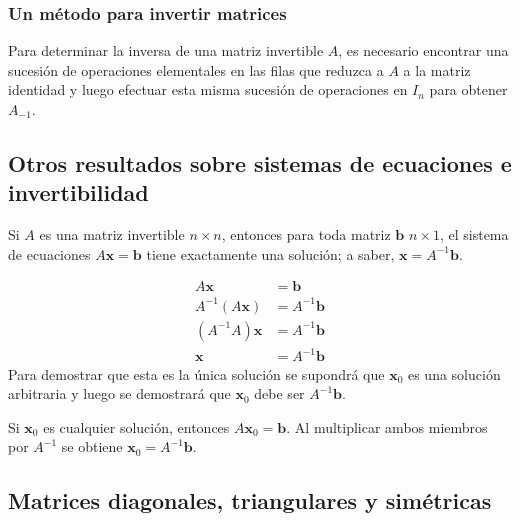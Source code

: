 \documentclass[a4paper,12pt]{article}
\begin{document}
\subsubsection{Un método para invertir matrices}

\begin{concept}[i]
  Para determinar la inversa de una matriz invertible $A$, es necesario
  encontrar una sucesión de operaciones elementales en las filas que reduzca a
  $A$ a la matriz identidad y luego efectuar esta misma sucesión de
  operaciones en $I_n$ para obtener $A_{-{1}}$.
\end{concept}

\subsection{Otros resultados sobre sistemas de ecuaciones e invertibilidad}

\begin{theorem}
  Si $A$ es una matriz invertible $n\times n$, entonces para toda matriz
  $\mathbf{b}$ $n\times 1$, el sistema de ecuaciones $A\mathbf{x}=\mathbf{b}$
  tiene exactamente una solución; a saber, $\mathbf{x}=A^{-1}\mathbf{b}$.
  \label{theo:resol_sist_lineales}
\end{theorem}

\demo
\begin{align*}
  A\mathbf{x}&=\mathbf{b} \\
  A^{-1}(A\mathbf{x})&=A^{-1}\mathbf{b} \\
  \left( A^{-1}A \right)\mathbf{x}&=A^{-1}\mathbf{b} \\
  \mathbf{x}&=A^{-1}\mathbf{b}
\end{align*}
Para demostrar que esta es la única solución se supondrá que $\mathbf{x}_0$ es
una solución arbitraria y luego se demostrará que $\mathbf{x}_0$ debe ser
$A^{-1}\mathbf{b}$.

Si $\mathbf{x}_0$ es cualquier solución, entonces $A\mathbf{x}_0=\mathbf{b}$.
Al multiplicar ambos miembros por $A^{-1}$ se obtiene
$\mathbf{x}_0=A^{-1}\mathbf{b}$.

\subsection{Matrices diagonales, triangulares y simétricas}
\end{document}
